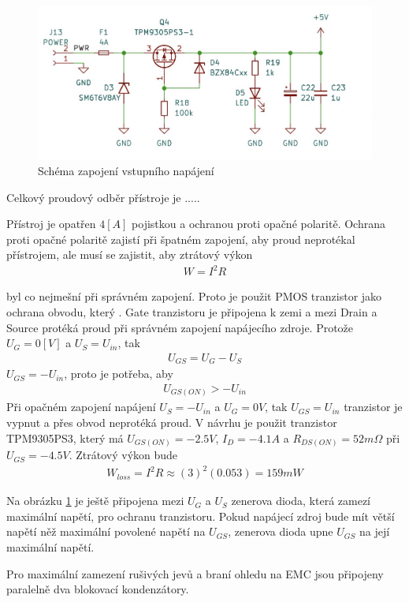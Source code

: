 \begin{figure}[H]
    \includegraphics[width=0.9\linewidth]{pictures/power.jpg}
    \caption{Schéma zapojení vstupního napájení}
    \label{fig:power_input}
\end{figure}

Celkový proudový odběr přístroje je .....

Přístroj je opatřen $4 [A]$ pojistkou a ochranou proti opačné polaritě.
Ochrana proti opačné polaritě zajistí při špatném zapojení, aby proud neprotékal přístrojem, ale musí se zajistit, aby ztrátový výkon
\begin{align*}
    W = I^2 R
\end{align*}

byl co nejmešní při správném zapojení. Proto je použit PMOS tranzistor jako ochrana obvodu, který . Gate tranzistoru je připojena k zemi a mezi Drain a Source protéká proud při správném zapojení napájecího zdroje. Protože $ U_G = 0 [V]$ a $U_S = U_{in}$, tak
\begin{align*}
    U_{GS} = U_G - U_S
\end{align*}
$U_{GS} = -U_{in} $, proto je potřeba, aby
\begin{align*}
    U_{GS(ON)} > -U_{in}
\end{align*}
Při opačném zapojení napájení $U_S = -U_{in}$ a $ U_G = 0 V$, tak  $U_{GS} = U_{in}$ tranzistor je vypnut a přes obvod neprotéká proud.
V návrhu je použit tranzistor TPM9305PS3, který má  $U_{GS(ON)} = -2.5V $,  $I_D = -4.1A$ a $R_{DS(ON)} = 52m \Omega$ při $U_{GS} = -4.5V$.
Ztrátový výkon bude
\begin{align*}
    W_{loss} = I^2 R \approx (3)^2 (0.053) =  159 mW
\end{align*}

Na obrázku \ref{fig:power_input} je ještě připojena mezi $U_G$ a $U_S$ zenerova dioda, která zamezí maximální napětí, pro ochranu tranzistoru. Pokud napájecí zdroj bude mít větší napětí něž maximální povolené napětí na $U_{GS}$, zenerova dioda upne $U_{GS}$ na její maximální napětí.
\par
Pro maximální zamezení rušivých jevů a braní ohledu na EMC jsou připojeny paralelně dva blokovací kondenzátory.

